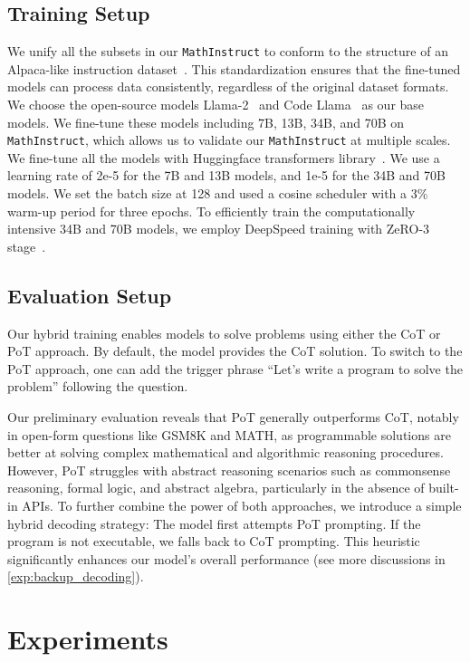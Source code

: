 \subsection{Training Setup} We unify all the subsets in our \texttt{MathInstruct} to conform to the structure of an Alpaca-like instruction dataset~\citep{alpaca}. This standardization ensures that the fine-tuned models can process data consistently, regardless of the original dataset formats. We choose the open-source models Llama-2~\citep{touvron2023llama2} and Code Llama~\citep{roziere2023code} as our base models. We fine-tune these models including 7B, 13B, 34B, and 70B on \texttt{MathInstruct}, which allows us to validate our \texttt{MathInstruct} at multiple scales. We fine-tune all the models with Huggingface transformers library~\citep{wolf2019huggingface}. We use a learning rate of 2e-5 for the 7B and 13B models, and 1e-5 for the 34B and 70B models. We set the batch size at 128 and used a cosine scheduler with a 3\% warm-up period for three epochs. To efficiently train the computationally intensive 34B and 70B models, we employ DeepSpeed training with ZeRO-3 stage~\citep{rajbhandari2020zero}. 

\subsection{Evaluation Setup}
\label{sec:eval_setup}
Our hybrid training enables models to solve problems using either the CoT or PoT approach. By default, the model provides the CoT solution. To switch to the PoT approach, one can add the trigger phrase ``Let's write a program to solve the problem'' following the question.

Our preliminary evaluation reveals that PoT generally outperforms CoT, notably in open-form questions like GSM8K and MATH, as programmable solutions are better at solving complex mathematical and algorithmic reasoning procedures. However, PoT struggles with abstract reasoning scenarios such as commonsense reasoning, formal logic, and abstract algebra, particularly in the absence of built-in APIs. To further combine the power of both approaches, we introduce a simple hybrid decoding strategy: The model first attempts PoT prompting. If the program is not executable, we falls back to CoT prompting. This heuristic significantly enhances our model's overall performance (see more discussions in \autoref{exp:backup_decoding}).  

\section{Experiments}

